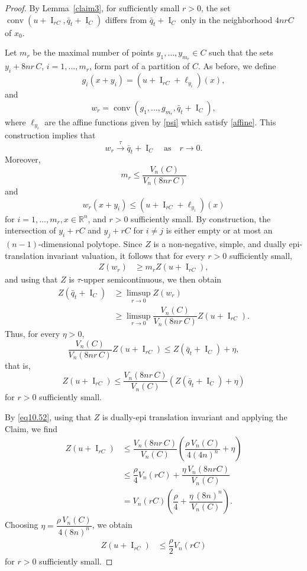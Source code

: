 \documentclass[11pt]{article}
\theoremstyle{definition} %
\DeclareMathOperator{\conv}{conv}
\DeclareMathOperator{\I}{I}
\newcommand{\seq}{\xrightarrow{\tau}}
\begin{document}
\begin{proof} 
By Lemma~\ref{claim3}, for sufficiently small $r>0$, the set $\conv(u+\I_{rC},\bar q_t+\I_C)$ differs from $\bar q_t+\I_C$ only in the neighborhood $4nrC$ of $x_0$.


Let $m_r$ be the maximal number of points $y_1, \dots, y_{m_r} \in C$ such that the sets 
$y_i + 8n r\, C$, $i = 1, \dots, m_r$, form part of a partition of $C$.
As before, we define
$$g_i(x+y_i)= (u+\I_{rC}+\ell_{y_i})(x),$$
and 
$$w_r=\conv(g_1, \dots,g_{m_r}, \bar{q}_t +\I_C),$$
where $\ell_{y_i}$ are the affine functions given by \eqref{psi} which satisfy \eqref{affine}. This construction implies that
$$w_r\seq \bar{q}_t+\I_C \quad \mbox{as} \quad r\rightarrow 0.$$
Moreover,
$$m_r\leq \dfrac{V_n(C)}{V_n( 8nr\, C)}$$
and
$$w_r(x+y_i)\leq (u+\I_{rC}+\ell_{y_i})(x)$$
for $i=1, \dots, m_r, x\in\mathbb{R}^n$, and $r>0$ sufficiently small. By construction,  the intersection of $y_i+rC$ and $y_j+rC$ for $i\neq j$ is either empty or at most an $(n-1)$-dimensional polytope. Since $Z$ is a  non-negative, simple, and  dually epi-translation invariant valuation, it follows that for every   $r>0$ sufficiently small, 
\begin{align*}
    Z(w_r) & \geq  m_r Z(u+\I_{rC}),
\end{align*}
and using  that $Z$ is  $\tau$-upper semicontinuous, we then obtain
\begin{align*}
    Z(\bar{q}_t+\I_C) & \geq \limsup_{r\rightarrow 0}Z(w_r) \\
    & \geq \limsup_{r\rightarrow 0}\dfrac{V_n(C)}{V_n( 8nr\, C)}  Z(u+\I_{rC}). 
\end{align*}
Thus, for every $\eta>0$,
$$\dfrac{V_n(C)}{V_n(8nr\, C)} Z(u+\I_{rC}) \leq Z(\bar{q}_t+\I_C) + \eta,$$
that is,
$$Z(u+\I_{rC}) \leq \dfrac{V_n(8nr\, C)}{V_n(C)}(Z(\bar{q}_t+\I_C)+ \eta) $$
for $r>0$ sufficiently small.

By \eqref{eq10.52}, using that $Z$ is dually-epi translation invariant and   applying the Claim, we find
\begin{align*}
    Z(u+\I_{rC}) &\leq \dfrac{V_n(8nr\, C)}{V_n(C)} \left( \dfrac{\rho \, V_n(C)}{4(4n)^n}+\eta \right)\\
    &\leq \dfrac{\rho}{4}V_n(rC)+\dfrac{\eta \, V_n(8nrC)}{V_n(C)}\\
    & =  V_n(rC)\left(\dfrac{\rho}{4}+\dfrac{\eta \, (8n)^n}{V_n(C)}\right).
\end{align*}
Choosing  $\eta = \dfrac{\rho \, V_n(C)}{4(8n)^n}$, we  obtain
\begin{align}\label{eq10.62}
 Z(u+\I_{rC})& \leq   \dfrac{\rho }{2}V_n(rC)
\end{align}
for $r>0$ sufficiently small.
\end{proof}
\end{document}
